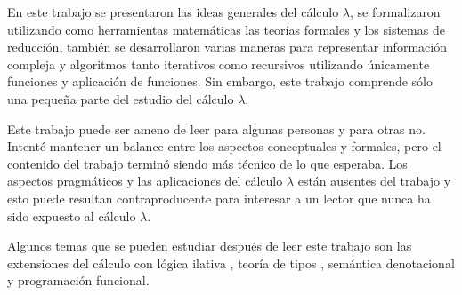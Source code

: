 En este trabajo se presentaron las ideas generales del cálculo \( λ \), se formalizaron utilizando como herramientas matemáticas las teorías formales y los sistemas de reducción, también se desarrollaron varias maneras para representar información compleja y algoritmos tanto iterativos como recursivos utilizando únicamente funciones y aplicación de funciones. Sin embargo, este trabajo comprende sólo una pequeña parte del estudio del cálculo \( λ \).

Este trabajo puede ser ameno de leer para algunas personas y para otras no. Intenté mantener un balance entre los aspectos conceptuales y formales, pero el contenido del trabajo terminó siendo más técnico de lo que esperaba. Los aspectos pragmáticos y las aplicaciones del cálculo \( λ \) están ausentes del trabajo y esto puede resultan contraproducente para interesar a un lector que nunca ha sido expuesto al cálculo \( λ \).

Algunos temas que se pueden estudiar después de leer este trabajo son las extensiones del cálculo con lógica ilativa \cite[pp.~573--576]{Barendregt:Bible}, teoría de tipos \cite{Pierce:TypesAndPLangs}, semántica denotacional \cite{Stoy:Semantics} y programación funcional.


